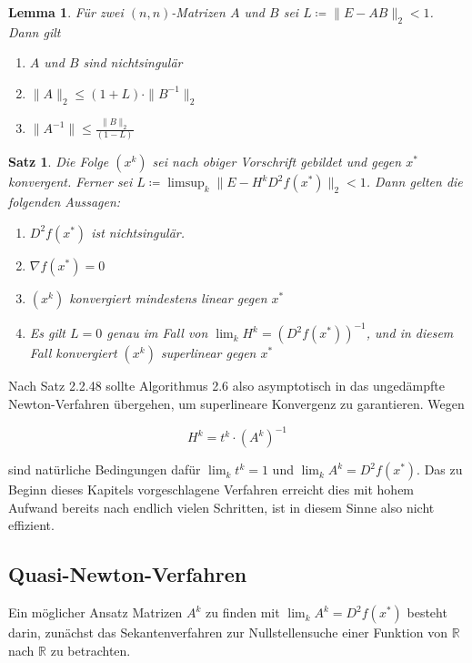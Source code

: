 \documentclass[11pt]{scrreprt}
\newcounter{thm}
\theoremstyle{thmstyle}
\numberwithin{thm}{section}
\newtheorem{lemma}[thm]{Lemma}
\newtheorem{satz}[thm]{Satz}
\begin{document}
\begin{lemma}
	Für zwei $(n,n)$-Matrizen $A$ und $B$ sei $L \coloneqq \| E - AB \|_2 < 1$. Dann gilt
	\begin{enumerate}[label=\alph*\upshape)]
		\item $A$ und $B$ sind nichtsingulär
		\item $\|A\|_2 \leq (1+ L) \cdot \| B^{-1} \|_2$
		\item $\| A^{-1} \| \leq \frac{\| B \|_2}{(1-L)}$
	\end{enumerate}
\end{lemma}
	
\begin{satz}
	Die Folge $(x^k)$ sei nach obiger Vorschrift gebildet und gegen $x^*$ konvergent. Ferner sei $L \coloneqq \limsup_k \| E - H^k D^2 f(x^*) \|_2 < 1$. Dann gelten die folgenden Aussagen:
	
	\begin{enumerate}[label=\alph*\upshape)]
		\item $D^2 f(x^*)$ ist nichtsingulär.
		\item $\nabla f(x^*) = 0$
		\item $(x^k)$ konvergiert mindestens linear gegen $x^*$
		\item Es gilt $L = 0$ genau im Fall von $\lim_k H^k = \left( D^2 f(x^*) \right)^{-1}$, und in diesem Fall konvergiert $(x^k)$ superlinear gegen $x^*$
	\end{enumerate}
\end{satz}	

Nach Satz 2.2.48 sollte Algorithmus 2.6 also asymptotisch in das ungedämpfte Newton-Verfahren übergehen, um superlineare Konvergenz zu garantieren. Wegen

	$$ H^k = t^k \cdot \left( A^k \right)^{-1} $$

sind natürliche Bedingungen dafür $\lim_k t^k = 1$ und $\lim_k A^k = D^2 f(x^*)$. Das zu Beginn dieses Kapitels vorgeschlagene Verfahren erreicht dies mit hohem Aufwand bereits nach endlich vielen Schritten, ist in diesem Sinne also nicht effizient.
	
\subsection*{Quasi-Newton-Verfahren}
	
Ein möglicher Ansatz Matrizen $A^k$ zu finden mit $\lim_k A^k = D^2 f(x^*)$ besteht darin, zunächst das Sekantenverfahren zur Nullstellensuche einer Funktion von $\mathbb{R}$ nach $\mathbb{R}$ zu betrachten. 
\end{document}
